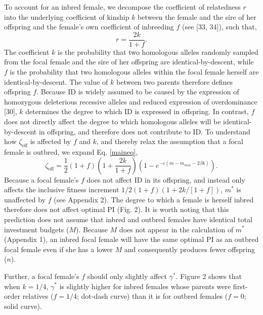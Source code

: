 \documentclass[12pt]{article}
\begin{document}
To account for an inbred female, we decompose the coefficient of relatedness $r$ into the underlying coefficient of kinship $k$ between the female and the sire of her offspring and the female's own coefficient of inbreeding $f$ (see [33, 34]), such that,
\begin{equation} \label{rdef}
r = \frac{2k}{1 + f}.
\end{equation}
The coefficient $k$ is the probability that two homologous alleles randomly sampled from the focal female and the sire of her offspring are identical-by-descent, while $f$ is the probability that two homologous alleles within the focal female herself are identical-by-descent. The value of $k$ between two parents therefore defines offspring $f$. Because ID is widely assumed to be caused by the expression of homozygous deleterious recessive alleles and reduced expression of overdominance [30], $k$ determines the degree to which ID is expressed in offspring. In contrast, $f$ does not directly affect the degree to which homologous alleles will be identical-by-descent in offspring, and therefore does not contribute to ID. To understand how $\zeta_{\textrm{off}}$ is affected by $f$ and $k$, and thereby relax the assumption that a focal female is outbred, we expand Eq. \ref{maineq},
\begin{equation} \label{maineqr}
\zeta_{\textrm{off}} = \frac{1}{2}\left(1+f\right)\left(1+\frac{2k}{1+f}\right)\left(1-e^{-c\left(m-m_{min}-2\beta k\right)}\right).
\end{equation}
Because a focal female's $f$ does not affect ID in its offspring, and instead only affects the inclusive fitness increment $1/2\left(1+f\right)\left(1+ 2 k / \left[1 + f\right]\right)$, $m^{*}$ is unaffected by $f$  (see Appendix 2). The degree to which a female is herself inbred therefore does not affect optimal PI (Fig. 2). It is worth noting that this prediction does not assume that inbred and outbred females have identical total investment budgets ($M$). Because $M$ does not appear in the calculation of $m^{*}$ (Appendix 1), an inbred focal female will have the same optimal PI as an outbred focal female even if she has a lower $M$ and consequently produces fewer offspring ($n$).

Further, a focal female's $f$ should only slightly affect $\gamma^{*}$. Figure 2 shows that when $k=1/4$, $\gamma^{*}$ is slightly higher for inbred females whose parents were first-order relatives ($f=1/4$; dot-dash curve) than it is for outbred females ($f=0$; solid curve).
\end{document}
